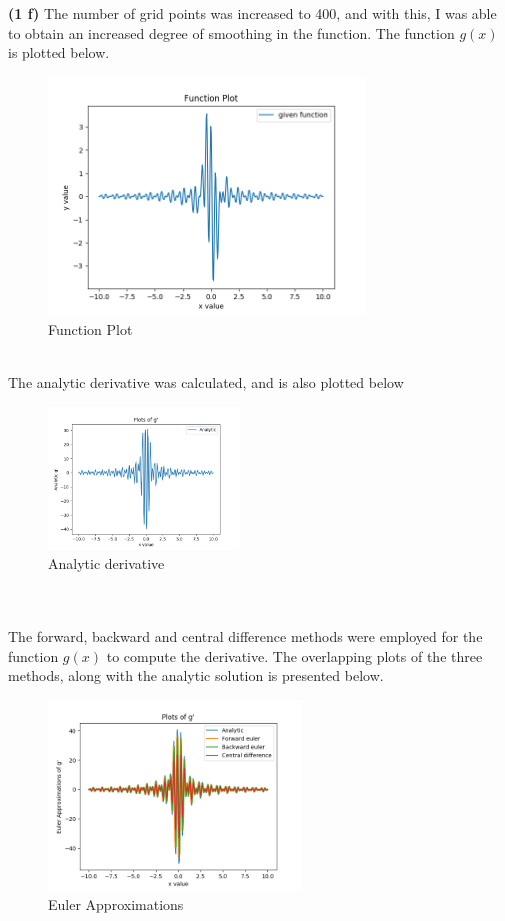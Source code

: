 \documentclass[12pt]{article}
\begin{document}
\textbf{(1 f)}
The number of grid points was increased to 400, and with this, I was able to obtain an increased degree of smoothing in the function. The function $g(x)$ is plotted below. 
\begin{figure}[h]
	\centering
	\includegraphics[width=0.75\textwidth]{functionplot400.png}
	\caption{Function Plot}
\end{figure}\\
The analytic derivative was calculated, and is also plotted below
\begin{figure}[h]
	\centering
	\includegraphics[width=0.45\textwidth]{gpranalytic.png}
	\caption{Analytic derivative}
\end{figure}\\\\
The forward, backward and central difference methods were employed for the function $g(x)$ to compute the derivative. The overlapping plots of the three methods, along with the analytic solution is presented below. 
\begin{figure}[h]
	\centering
	\includegraphics[width=0.60\textwidth]{gprimeeulerplot400.png}
	\caption{Euler Approximations}
\end{figure}\\\\\\
\end{document}
